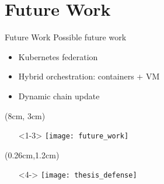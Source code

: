 \section{Future Work}
\begin{frame}{Future Work}
  Possible future work
  \begin{itemize}
  \item<1-> Kubernetes federation
  \item<2-> Hybrid orchestration: containers + VM
  \item<3-> Dynamic chain update
  \end{itemize}

  \begin{textblock*}{5cm}(8cm, 3cm)
    \begin{itemize}
    \item[]<1-3> \texttt{[image: future\_work]}
    \end{itemize}
  \end{textblock*}

  \begin{textblock*}{5cm}(0.26cm,1.2cm)
    \begin{itemize}
      \item[]<4-> \centering \texttt{[image: thesis\_defense]}
    \end{itemize}
  \end{textblock*}
\end{frame}
